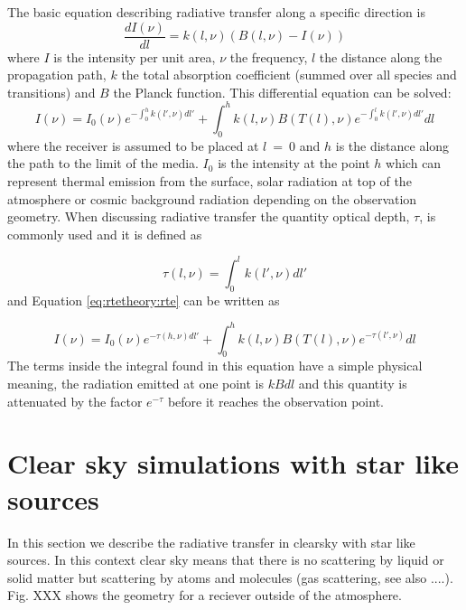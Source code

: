  The basic equation describing radiative transfer along a specific 
 direction is
 \begin{equation}
   \frac{dI(\nu)}{dl} = k(l,\nu)(B(l,\nu)-I(\nu))
  \label{eq:rtetheory:chand}
 \end{equation} 
 where $I$ is the intensity per unit area, $\nu$ the frequency, $l$
 the distance along the propagation path, $k$ the total absorption
 coefficient (summed over all species and transitions) and $B$ the
 Planck function. This differential equation can be solved:
 \begin{equation}
   I(\nu) = I_0(\nu)e^{-\int^h_0{k(l',\nu)dl'}} + 
     \int^h_0{k(l,\nu)B(T(l),\nu) e^{-\int^l_0{k(l',\nu)dl'}} dl}
  \label{eq:rtetheory:rte}
 \end{equation}  
 where the receiver is assumed to be placed at $l$~=~0 and $h$ is the
 distance along the path to the limit of the media. $I_0$ is the
 intensity at the point $h$ which can represent thermal emission from
 the surface, solar radiation at top of the atmosphere or cosmic
 background radiation depending on the observation geometry. When
 discussing radiative transfer the quantity optical depth, $\tau$, is
 commonly used and it is defined as

 \begin{equation}
   \tau(l,\nu) = \int^l_0{k(l',\nu)dl'} 
  \label{eq:rtetheory:tau}
 \end{equation}  
 and Equation \ref{eq:rtetheory:rte} can be written as
 
 \begin{equation}
   I(\nu) = I_0(\nu)e^{-\tau(h,\nu)dl'} + 
     \int^h_0{k(l,\nu)B(T(l),\nu) e^{-\tau(l',\nu)} dl}
  \label{eq:rtetheory:rte2}
 \end{equation}  
 The terms inside the integral found in this equation have a simple
 physical meaning, the radiation emitted at one point is $kBdl$ and this
 quantity is attenuated by the factor $e^{-\tau}$ before it reaches the
 observation point.

 \section{Clear sky simulations with star like sources}
 \label{sec:rtetheory:ClearskyDirectSources}

 In this section we describe the radiative transfer in clearsky with star 
 like sources.
 In this context clear sky means that there is no scattering by liquid or 
 solid matter but scattering by atoms and molecules (gas scattering, see also ....).
 Fig. XXX  shows the geometry for a reciever outside of the atmosphere.

